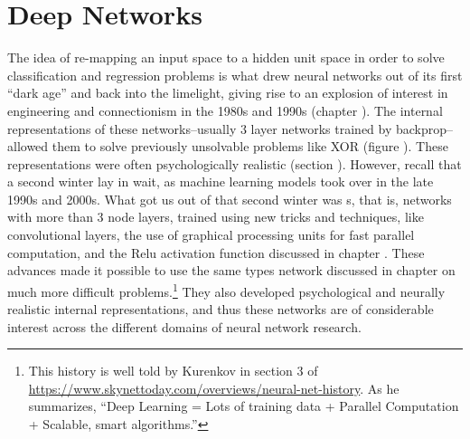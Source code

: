 \chapter{Deep Networks}\label{ch_deepNets}


The idea of re-mapping an input space to a hidden unit space in order to solve classification and regression problems is what drew neural networks out of its first ``dark age'' and back into the limelight, giving rise to an explosion of interest in engineering and connectionism in the 1980s and 1990s (chapter ). The internal representations of these networks--usually 3 layer networks trained by backprop--allowed them to solve previously unsolvable problems like XOR (figure ). These representations were often psychologically realistic (section ). However, recall that a second  winter lay in wait, as machine learning models took over in the late 1990s and 2000s. What got us out of that second winter was s, that is, networks with more than 3 node layers, trained using new tricks and techniques, like convolutional layers, the use of graphical processing units for fast parallel computation, and the Relu activation function discussed in chapter . These advances made it possible to use the same types network discussed in chapter  on much more difficult problems.\footnote{This history is well told by Kurenkov in section 3 of \url{https://www.skynettoday.com/overviews/neural-net-history}. As he summarizes, ``Deep Learning = Lots of training data + Parallel Computation + Scalable, smart algorithms.''}  They also developed psychological and neurally realistic internal representations, and thus these networks are of considerable interest across the different domains of neural network research.

